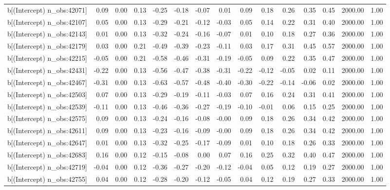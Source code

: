 \begin{table}[ht]
\begin{tabular}{rrrrrrrrrrrrrrr}
  b[(Intercept) n\_obs:42071] & 0.09 & 0.00 & 0.13 & -0.25 & -0.18 & -0.07 & 0.01 & 0.09 & 0.18 & 0.26 & 0.35 & 0.45 & 2000.00 & 1.00 \\ 
  b[(Intercept) n\_obs:42107] & 0.05 & 0.00 & 0.13 & -0.29 & -0.21 & -0.12 & -0.03 & 0.05 & 0.14 & 0.22 & 0.31 & 0.40 & 2000.00 & 1.00 \\ 
  b[(Intercept) n\_obs:42143] & 0.01 & 0.00 & 0.13 & -0.32 & -0.24 & -0.16 & -0.07 & 0.01 & 0.10 & 0.18 & 0.27 & 0.36 & 2000.00 & 1.00 \\ 
  b[(Intercept) n\_obs:42179] & 0.03 & 0.00 & 0.21 & -0.49 & -0.39 & -0.23 & -0.11 & 0.03 & 0.17 & 0.31 & 0.45 & 0.57 & 2000.00 & 1.00 \\ 
  b[(Intercept) n\_obs:42215] & -0.05 & 0.00 & 0.21 & -0.58 & -0.46 & -0.31 & -0.19 & -0.05 & 0.09 & 0.22 & 0.35 & 0.47 & 2000.00 & 1.00 \\ 
  b[(Intercept) n\_obs:42431] & -0.22 & 0.00 & 0.13 & -0.56 & -0.47 & -0.38 & -0.31 & -0.22 & -0.12 & -0.05 & 0.02 & 0.11 & 2000.00 & 1.00 \\ 
  b[(Intercept) n\_obs:42467] & -0.31 & 0.00 & 0.13 & -0.63 & -0.57 & -0.48 & -0.40 & -0.30 & -0.22 & -0.14 & -0.06 & 0.02 & 2000.00 & 1.00 \\ 
  b[(Intercept) n\_obs:42503] & 0.07 & 0.00 & 0.13 & -0.29 & -0.19 & -0.11 & -0.03 & 0.07 & 0.16 & 0.24 & 0.31 & 0.41 & 2000.00 & 1.00 \\ 
  b[(Intercept) n\_obs:42539] & -0.11 & 0.00 & 0.13 & -0.46 & -0.36 & -0.27 & -0.19 & -0.10 & -0.01 & 0.06 & 0.15 & 0.25 & 2000.00 & 1.00 \\ 
  b[(Intercept) n\_obs:42575] & 0.09 & 0.00 & 0.13 & -0.24 & -0.16 & -0.08 & -0.00 & 0.09 & 0.18 & 0.26 & 0.34 & 0.42 & 2000.00 & 1.00 \\ 
  b[(Intercept) n\_obs:42611] & 0.09 & 0.00 & 0.13 & -0.23 & -0.16 & -0.09 & -0.00 & 0.09 & 0.18 & 0.26 & 0.34 & 0.42 & 2000.00 & 1.00 \\ 
  b[(Intercept) n\_obs:42647] & 0.01 & 0.00 & 0.13 & -0.32 & -0.25 & -0.17 & -0.09 & 0.01 & 0.10 & 0.18 & 0.26 & 0.33 & 2000.00 & 1.00 \\ 
  b[(Intercept) n\_obs:42683] & 0.16 & 0.00 & 0.12 & -0.15 & -0.08 & 0.00 & 0.07 & 0.16 & 0.25 & 0.32 & 0.40 & 0.47 & 2000.00 & 1.00 \\ 
  b[(Intercept) n\_obs:42719] & -0.04 & 0.00 & 0.12 & -0.36 & -0.27 & -0.20 & -0.12 & -0.04 & 0.05 & 0.12 & 0.19 & 0.27 & 2000.00 & 1.00 \\ 
  b[(Intercept) n\_obs:42755] & 0.04 & 0.00 & 0.12 & -0.28 & -0.20 & -0.12 & -0.05 & 0.04 & 0.12 & 0.19 & 0.27 & 0.33 & 2000.00 & 1.00 \\ 

\end{tabular}
\end{table}
